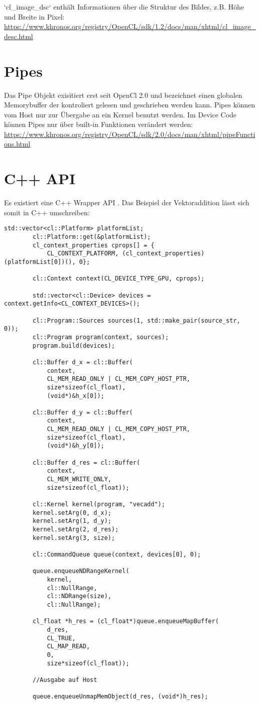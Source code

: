 		\li`cl_image_dsc` enthält Informationen über die Struktur des Bildes, z.B. Höhe und Breite in Pixel: \url{https://www.khronos.org/registry/OpenCL/sdk/1.2/docs/man/xhtml/cl_image_desc.html}
		
		\section{Pipes}
		Das Pipe Objekt exisitiert erst seit OpenCl 2.0 und bezeichnet einen globalen Memorybuffer der kontroliert gelesen und geschrieben werden kann. Pipes können vom Host nur zur Übergabe an ein \Gls{Kernel} benutzt werden. Im Device Code können Pipes nur über built-in Funktionen verändert werden: \url{https://www.khronos.org/registry/OpenCL/sdk/2.0/docs/man/xhtml/pipeFunctions.html}
		
		\section{C++ API}
		Es existiert eine C++ Wrapper \Gls{API} \autocite{oclC++API}.  Das Beispiel der Vektoraddition lässt sich somit in C++ umschreiben:
		\begin{lstlisting}[caption=~OpenCL C++ API]
		std::vector<cl::Platform> platformList;
		cl::Platform::get(&platformList);
		cl_context_properties cprops[] = {
			CL_CONTEXT_PLATFORM, (cl_context_properties)(platformList[0])(), 0};
    
		cl::Context context(CL_DEVICE_TYPE_GPU, cprops);

		std::vector<cl::Device> devices = context.getInfo<CL_CONTEXT_DEVICES>();

		cl::Program::Sources sources(1, std::make_pair(source_str, 0));
		cl::Program program(context, sources);
		program.build(devices);

		cl::Buffer d_x = cl::Buffer(
			context, 
			CL_MEM_READ_ONLY | CL_MEM_COPY_HOST_PTR, 
			size*sizeof(cl_float), 
			(void*)&h_x[0]);

		cl::Buffer d_y = cl::Buffer(
			context, 
			CL_MEM_READ_ONLY | CL_MEM_COPY_HOST_PTR, 
			size*sizeof(cl_float), 
			(void*)&h_y[0]);

		cl::Buffer d_res = cl::Buffer(
			context, 
			CL_MEM_WRITE_ONLY, 
			size*sizeof(cl_float));

		cl::Kernel kernel(program, "vecadd");
		kernel.setArg(0, d_x);
		kernel.setArg(1, d_y);
		kernel.setArg(2, d_res);
		kernel.setArg(3, size);
    
		cl::CommandQueue queue(context, devices[0], 0);

		queue.enqueueNDRangeKernel(
			kernel, 
			cl::NullRange, 
			cl::NDRange(size), 
			cl::NullRange);
 
		cl_float *h_res = (cl_float*)queue.enqueueMapBuffer(
			d_res,
			CL_TRUE,
			CL_MAP_READ,
			0,
			size*sizeof(cl_float));

		//Ausgabe auf Host

		queue.enqueueUnmapMemObject(d_res, (void*)h_res);
		\end{lstlisting}

